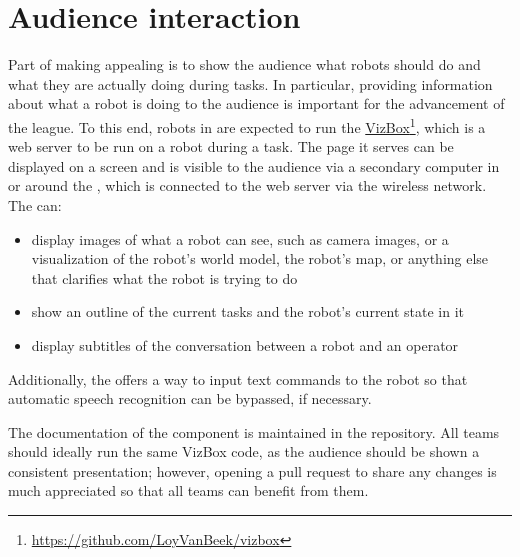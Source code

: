\section{Audience interaction}\label{rule:vizbox}

Part of making \RoboCup\AtHome{} appealing is to show the audience what robots should do and what they are actually doing during tasks.
In particular, providing information about what a robot is doing to the audience is important for the advancement of the league.
To this end, robots in \AtHome{} are expected to run the \RoboCup\AtHome{} \href{https://github.com/LoyVanBeek/vizbox}{VizBox}\footnote{\url{https://github.com/LoyVanBeek/vizbox}}, which is a web server to be run on a robot during a task.
The page it serves can be displayed on a screen and is visible to the audience via a secondary computer in or around the \Arena{}, which is connected to the web server via the wireless network.
The  can:
\begin{itemize}
	\item display images of what a robot can see, such as camera images, or a visualization of the robot's world model, the robot's map, or anything else that clarifies what the robot is trying to do
	\item show an outline of the current tasks and the robot's current state in it
	\item display subtitles of the conversation between a robot and an operator
\end{itemize}
Additionally, the  offers a way to input text commands to the robot so that automatic speech recognition can be bypassed, if necessary.

The documentation of the component is maintained in the  repository.
All teams should ideally run the same VizBox code, as the audience should be shown a consistent presentation; however, opening a pull request to share any changes is much appreciated so that all teams can benefit from them.
